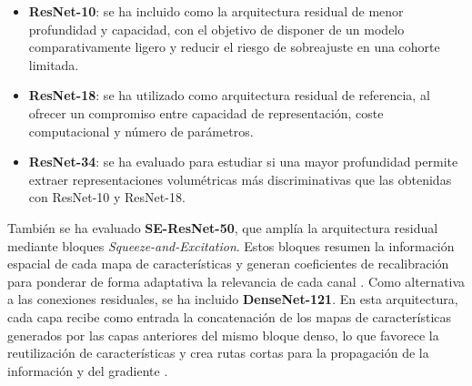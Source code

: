 \begin{itemize}
    \item \textbf{ResNet-10}: se ha incluido como la arquitectura residual de menor profundidad y capacidad, con el objetivo de disponer de un modelo comparativamente ligero y reducir el riesgo de sobreajuste en una cohorte limitada.
    \item \textbf{ResNet-18}: se ha utilizado como arquitectura residual de referencia, al ofrecer un compromiso entre capacidad de representación, coste computacional y número de parámetros.
    \item \textbf{ResNet-34}: se ha evaluado para estudiar si una mayor profundidad permite extraer representaciones volumétricas más discriminativas que las obtenidas con ResNet-10 y ResNet-18.
\end{itemize}



También se ha evaluado \textbf{SE-ResNet-50}, que amplía la arquitectura residual mediante bloques \textit{Squeeze-and-Excitation}. Estos bloques resumen la información espacial de cada mapa de características y generan coeficientes de recalibración para ponderar de forma adaptativa la relevancia de cada canal \cite{hu2018squeeze}. Como alternativa a las conexiones residuales, se ha incluido \textbf{DenseNet-121}. En esta arquitectura, cada capa recibe como entrada la concatenación de los mapas de características generados por las capas anteriores del mismo bloque denso, lo que favorece la reutilización de características y crea rutas cortas para la propagación de la información y del gradiente \cite{huang2017densely}.

